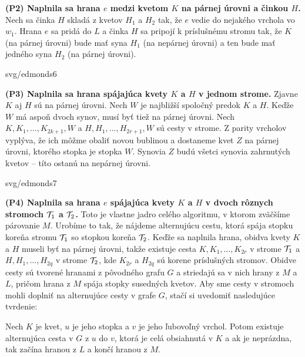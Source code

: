 \vspace*{-4ex}
\noindent
{\bf (P2) Naplnila sa hrana $e$ medzi kvetom $K$ na párnej úrovni a činkou $H$.} Nech sa činka $H$ skladá z 
kvetov $H_1$ a $H_2$ tak, že $e$ vedie do nejakého vrchola vo $w_1$. Hrana $e$ sa pridá do $L$ a
činka $H$ sa pripojí k príslušnému stromu tak, že $K$ (na párnej úrovni) bude mať syna $H_1$ (na nepárnej úrovni)
a ten bude mať jedného syna $H_2$ (na párnej úrovni).
\begin{myfig}{0.7\textwidth}{svg/edmonds6}
\end{myfig}

\vspace*{-4ex}
\noindent
{\bf (P3) Naplnila sa hrana spájajúca kvety $K$ a $H$ v jednom strome.} Zjavne $K$ aj $H$ sú na párnej úrovni.
Nech $W$ je najbližší spoločný predok $K$ a $H$. Keďže $W$ má aspoň dvoch synov, musí byť tiež na párnej úrovni.
Nech $K,K_1,\ldots,K_{2k+1},W$ a $H,H_1,\ldots,H_{2r+1},W$ sú cesty v strome. Z parity vrcholov vyplýva, že
ich môžme obaliť novou bublinou a dostaneme kvet $Z$ na párnej úrovni, ktorého stopka je stopka $W$. Synovia
$Z$ budú všetci synovia zahrnutých kvetov -- títo ostanú na nepárnej úrovni. 
\begin{myfig}{0.8\textwidth}{svg/edmonds7}
\end{myfig}

\vspace*{-4ex}
\noindent
{\bf (P4) Naplnila sa hrana $e$ spájajúca kvety $K$ a $H$ v dvoch rôznych stromoch ${\cal T}_1$ a ${\cal T}_2$.} 
Toto je vlastne jadro celého algoritmu, v ktorom zväčšíme párovanie $M$. Urobíme to tak, že nájdeme 
alternujúcu cestu, ktorá spája stopku koreňa stromu ${\cal T}_1$ so stopkou koreňa ${\cal T}_2$.
Keďže sa naplnila hrana, obidva kvety $K$ a $H$ museli byť na párnej úrovni, takže existuje cesta
$K,K_1,\ldots,K_{2r}$ v strome ${\cal T}_1$ a $H,H_1,\ldots,H_{2q}$ v strome ${\cal T}_2$, kde $K_{2r}$ a $H_{2q}$ sú
korene príslušných stromov. Obidve cesty sú tvorené hranami z pôvodného grafu $G$
a striedajú sa v nich hrany z $M$ a $L$, pričom hrana z $M$ spája
stopky susedných kvetov. 
Aby sme cesty v stromoch  mohli doplniť na alternujúce 
cesty v grafe $G$, stačí si uvedomiť nasledujúce tvrdenie:

\begin{lema}
  \label{lm:1f:tmp1}
  Nech $K$ je kvet, $u$ je jeho stopka  a $v$ je jeho ľubovoľný vrchol. Potom 
  existuje alternujúca cesta v $G$ z $u$ do $v$, 
  ktorá je celá obsiahnutá v $K$ a ak je neprázdna, tak začína hranou z $L$ a končí hranou z $M$.
\end{lema}


